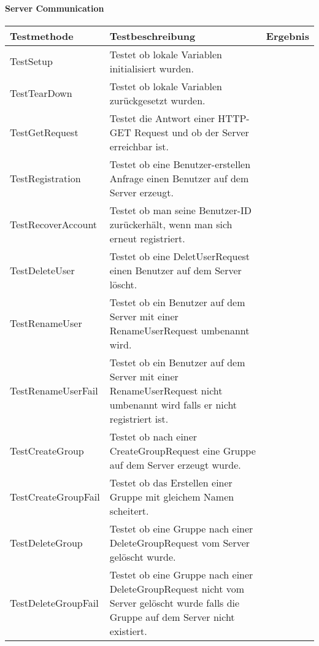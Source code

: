 		\paragraph{Server Communication}
		\begin{table}[H]
			{
				\begin{tabular}{|p{}|p{}|>{\centering}p{}|}
					\hline
					Testmethode & Testbeschreibung & Ergebnis\tabularnewline
					\hline
					\hspace{0pt}TestSetup & Testet ob lokale Variablen initialisiert wurden. &	\checkmark\tabularnewline
					\hspace{0pt}TestTearDown & Testet ob lokale Variablen zurückgesetzt wurden. &	\checkmark\tabularnewline
					\hspace{0pt}TestGetRequest & Testet die Antwort einer HTTP-GET Request und ob der Server erreichbar ist. &	\checkmark\tabularnewline
					\hspace{0pt}TestRegistration & Testet ob eine Benutzer-erstellen Anfrage einen Benutzer auf dem Server erzeugt. &	\checkmark\tabularnewline
					\hspace{0pt}TestRecoverAccount & Testet ob man seine Benutzer-ID zurückerhält, wenn man sich erneut registriert. &	\checkmark\tabularnewline
					\hspace{0pt}TestDeleteUser & Testet ob eine DeletUserRequest einen Benutzer auf dem Server löscht. &	\checkmark\tabularnewline
					\hspace{0pt}TestRenameUser & Testet ob ein Benutzer auf dem Server mit einer RenameUserRequest umbenannt wird. &	\checkmark\tabularnewline
					\hspace{0pt}TestRenameUserFail & Testet ob ein Benutzer auf dem Server mit einer RenameUserRequest nicht umbenannt wird falls er nicht registriert ist. &	\checkmark\tabularnewline
					\hspace{0pt}TestCreateGroup & Testet ob nach einer CreateGroupRequest eine Gruppe auf dem Server erzeugt wurde. &	\checkmark\tabularnewline
					\hspace{0pt}TestCreateGroupFail & Testet ob das Erstellen einer Gruppe mit gleichem Namen scheitert. &	\checkmark\tabularnewline
					\hspace{0pt}TestDeleteGroup & Testet ob eine Gruppe nach einer DeleteGroupRequest vom Server gelöscht wurde. &	\checkmark\tabularnewline
					\hspace{0pt}TestDeleteGroupFail & Testet ob eine Gruppe nach einer DeleteGroupRequest nicht vom Server gelöscht wurde falls die Gruppe auf dem Server nicht existiert. &	\checkmark\tabularnewline

\end{tabular}}
\end{table}
